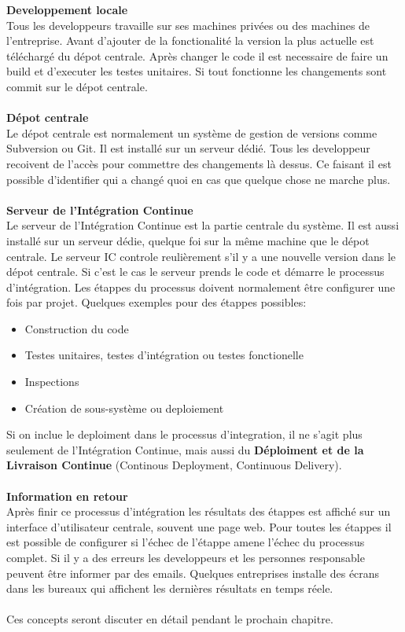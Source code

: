 \textbf{Developpement locale}\\
Tous les developpeurs travaille sur ses machines privées ou des machines de l'entreprise. Avant d'ajouter de la fonctionalité la version la plus actuelle est téléchargé du dépot centrale. Après changer le code il est necessaire de faire un build et d'executer les testes unitaires. Si tout fonctionne les changements sont commit sur le dépot centrale.\\\\
\textbf{Dépot centrale}\\
Le dépot centrale est normalement un système de gestion de versions comme Subversion ou Git. Il est installé sur un serveur dédié. Tous les developpeur recoivent de l'accès pour commettre des changements là dessus. Ce faisant il est possible d'identifier qui a changé quoi en cas que quelque chose ne marche plus.\\\\
\textbf{Serveur de l'Intégration Continue} \\
Le serveur de l'Intégration Continue est la partie centrale du système. Il est aussi installé sur un serveur dédie, quelque foi sur la même machine que le dépot centrale. Le serveur IC controle reulièrement s'il y a une nouvelle version dans le dépot centrale. Si c'est le cas le serveur prends le code et démarre le processus d'intégration. Les étappes du processus doivent normalement être configurer une fois par projet. Quelques exemples pour des étappes possibles:
\begin{itemize}
\item Construction du code
\item Testes unitaires, testes d'intégration ou testes fonctionelle
\item Inspections
\item Création de sous-système ou deploiement
\end{itemize}
Si on inclue le deploiment dans le processus d'integration, il ne s'agit plus seulement de l'Intégration Continue, mais aussi du \textbf{Déploiment et de la Livraison Continue} (Continous Deployment, Continuous Delivery). 
\\\\
\textbf{Information en retour}\\
Après finir ce processus d'intégration les résultats des étappes est affiché sur un interface d'utilisateur centrale, souvent une page web. Pour toutes les étappes il est possible de configurer si l'échec de l'étappe amene l'échec du processus complet. Si il y a des erreurs les developpeurs et les personnes responsable peuvent être informer par des emails. Quelques entreprises installe des écrans dans les bureaux qui affichent les dernières résultats en temps réele.\\\\
Ces concepts seront discuter en détail pendant le prochain chapitre.
